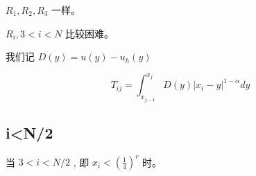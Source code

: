 \documentclass{ctexart}
\begin{document}
\(R_1, R_2, R_3\) 一样。





\newpage

\(R_i, 3<i< N\) 比较困难。


我们记 \(D(y) = u(y) - u_h(y)\)

\begin{equation}
    T_{ij} = \int_{x_{j-1}}^{x_{j}} D(y) |x_i - y|^{1-\alpha} dy
\end{equation}



\subsection{i<N/2}

当 \(3<i<N/2\) , 即 \(x_i<(\frac{1}{4})^r\) 时。
\end{document}
